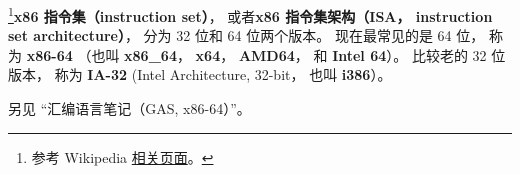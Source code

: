 
\begin{issues}
\issueDraft
\end{issues}

\footnote{参考 Wikipedia \href{https://en.wikipedia.org/wiki/X86-64}{相关页面}。}\textbf{x86 指令集（instruction set）}， 或者\textbf{x86 指令集架构（ISA， instruction set architecture）}， 分为 32 位和 64 位两个版本。 现在最常见的是 64 位， 称为 \textbf{x86-64} （也叫 \textbf{x86_64}， \textbf{x64}， \textbf{AMD64}， 和 \textbf{Intel 64}）。 比较老的 32 位版本， 称为 \textbf{IA-32} (Intel Architecture, 32-bit， 也叫 \textbf{i386}）。

另见 “汇编语言笔记（GAS, x86-64）”。
